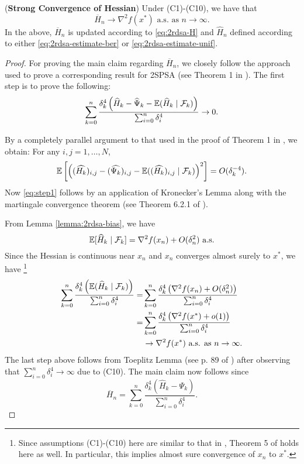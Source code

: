 \begin{theorem}(\textbf{Strong Convergence of Hessian})
\label{thm:2rdsa-H}
Under (C1)-(C10), we have that 
$$\overline H_n \rightarrow \nabla^2 f(x^*) \text{ a.s. as } n\rightarrow \infty.$$ 
In the above, $\overline H_n$ is updated according to \eqref{eq:2rdsa-H} and $\widehat H_n$ defined according to either \eqref{eq:2rdsa-estimate-ber} or \eqref{eq:2rdsa-estimate-unif}. 
\end{theorem}
\begin{proof}

For proving the main claim regarding $\overline H_n$, we closely follow the approach used to prove a corresponding result for 2SPSA (see Theorem 1 in \cite{spall-jacobian}). 
The first step is to prove the following:
\begin{align}
\sum_{k=0}^n \dfrac{\delta_k^4 \left(\widehat H_k - \widehat \Psi_k - \mathbb{E}(\widehat H_k \mid \mathcal{F}_k)\right)}{\sum_{i=0}^n \delta_i^4} \rightarrow 0.
\label{eq:step1}
\end{align}

By a completely parallel argument to that used in the proof of Theorem 1 in \cite{spall-jacobian}, we obtain: For any $i,j = 1,\ldots,N$,
\begin{align*}
\mathbb{E} \left[\left((\widehat {H_k})_{i,j} - (\widehat {\Psi_k})_{i,j} - \mathbb{E}((\widehat {H_k})_{i,j} \mid \mathcal{F}_k)\right)^2\right] = O(\delta_k^{-4}).
\end{align*}
Now \eqref{eq:step1} follows by an application of Kronecker's Lemma along with the martingale convergence theorem (see Theorem 6.2.1 of \cite{lahaprobability}).

From Lemma \ref{lemma:2rdsa-bias}, we have 
$$ \mathbb{E}[ \widehat H_k \mid \mathcal{F}_k] = \nabla^2 f(x_n) + O(\delta_n^2) \text{ a.s.}$$
Since the Hessian is continuous near $x_n$ and $x_n$ converges almost surely to $x^*$, we have
\footnote{Since assumptions (C1)-(C10) here are similar to that in \cite{prashanth2015rdsa}, Theorem 5 of \cite{prashanth2015rdsa} holds here as well. In particular, this implies almost sure convergence of $x_n$ to $x^*$.}
\begin{align*}
\sum_{k=0}^n \dfrac{\delta_k^4 \left(\mathbb{E}(\widehat H_k \mid \mathcal{F}_k)\right)}{\sum_{i=0}^n \delta_i^4} 
=&\sum_{k=0}^n \dfrac{\delta_k^4 \left(\nabla^2 f(x_n) + O(\delta_n^2)\right)}{\sum_{i=0}^n \delta_i^4}\\
=&\sum_{k=0}^n \dfrac{\delta_k^4 \left(\nabla^2 f(x^*) + o(1)\right)}{\sum_{i=0}^n \delta_i^4}\\
&\rightarrow \nabla^2 f(x^*) \text{ a.s. as } n \rightarrow \infty.
\end{align*}
The last step above follows from Toeplitz Lemma (see p. 89 of \cite{lahaprobability}) after observing that $\sum_{i=0}^n \delta_i^4 \rightarrow \infty$ due to (C10). 
The main claim now follows since 
$$ \overline H_n = \sum_{k=0}^n \dfrac{\delta_k^4 \left(\widehat H_k - \Psi_k \right)}{\sum_{i=0}^n \delta_i^4}.$$
\end{proof}


